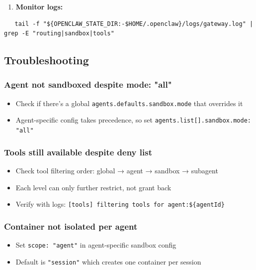 \begin{enumerate}
  \item \textbf{Monitor logs:}
\end{enumerate}


\begin{lstlisting}
   tail -f "${OPENCLAW_STATE_DIR:-$HOME/.openclaw}/logs/gateway.log" | grep -E "routing|sandbox|tools"
\end{lstlisting}


\hrulefill


\subsection{Troubleshooting}


\subsubsection{Agent not sandboxed despite mode: "all"}


\begin{itemize}
  \item Check if there's a global \texttt{agents.defaults.sandbox.mode} that overrides it
  \item Agent-specific config takes precedence, so set \texttt{agents.list[].sandbox.mode: "all"}
\end{itemize}


\subsubsection{Tools still available despite deny list}


\begin{itemize}
  \item Check tool filtering order: global → agent → sandbox → subagent
  \item Each level can only further restrict, not grant back
  \item Verify with logs: \texttt{[tools] filtering tools for agent:\$\{agentId\}}
\end{itemize}


\subsubsection{Container not isolated per agent}


\begin{itemize}
  \item Set \texttt{scope: "agent"} in agent-specific sandbox config
  \item Default is \texttt{"session"} which creates one container per session
\end{itemize}


